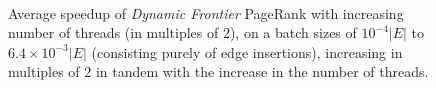 \begin{figure}[!hbt]
  \centering
   \\[-2ex]
  \caption{Average speedup of \textit{Dynamic Frontier} PageRank with increasing number of threads (in multiples of $2$), on a batch sizes of $10^{-4}|E|$ to $6.4\times10^{-3}|E|$ (consisting purely of edge insertions), increasing in multiples of $2$ in tandem with the increase in the number of threads.}
  \label{fig:weak-scaling}
\end{figure}
